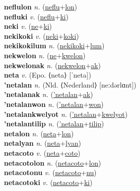 \textbf{neflulon} \textit{n.} (\hyperref[neflu]{neflu}+\hyperref[lon]{lon})
 \label{neflulon} \\
\textbf{nefluki} \textit{v.} (\hyperref[neflu]{neflu}+\hyperref[ki]{ki})
 \label{nefluki} \\
\textbf{neki} \textit{v.} (\hyperref[ne]{ne}+\hyperref[ki]{ki})
 \label{neki} \\
\textbf{nekikoki} \textit{v.} (\hyperref[neki]{neki}+\hyperref[koki]{koki})
 \label{nekikoki} \\
\textbf{nekikokilum} \textit{n.} (\hyperref[nekikoki]{nekikoki}+\hyperref[lum]{lum})
 \label{nekikokilum} \\
\textbf{nekwelon} \textit{n.} (\hyperref[ne]{ne}+\hyperref[kwelon]{kwelon})
 \label{nekwelon} \\
\textbf{nekwelonak} \textit{n.} (\hyperref[nekwelon]{nekwelon}+\hyperref[ak]{ak})
 \label{nekwelonak} \\
\textbf{neta} \textit{v.} (Epo. ⟨neta⟩ [ˈneta])
 \label{neta} \\
\textbf{'netalan} \textit{n.} (Nld. ⟨Nederland⟩ [neːdərlɑnt])
 \label{'netalan} \\
\textbf{'netalanak} \textit{n.} (\hyperref['netalan]{'netalan}+\hyperref[ak]{ak})
 \label{'netalanak} \\
\textbf{'netalanwon} \textit{n.} (\hyperref['netalan]{'netalan}+\hyperref[won]{won})
 \label{'netalanwon} \\
\textbf{'netalankwelyot} \textit{n.} (\hyperref['netalan]{'netalan}+\hyperref[kwelyot]{kwelyot})
 \label{'netalankwelyot} \\
\textbf{'netalantilip} \textit{n.} (\hyperref['netalan]{'netalan}+\hyperref[tilip]{tilip})
 \label{'netalantilip} \\
\textbf{netalon} \textit{n.} (\hyperref[neta]{neta}+\hyperref[lon]{lon})
 \label{netalon} \\
\textbf{netalyan} \textit{n.} (\hyperref[neta]{neta}+\hyperref[lyan]{lyan})
 \label{netalyan} \\
\textbf{netacoto} \textit{v.} (\hyperref[neta]{neta}+\hyperref[coto]{coto})
 \label{netacoto} \\
\textbf{netacotolon} \textit{n.} (\hyperref[netacoto]{netacoto}+\hyperref[lon]{lon})
 \label{netacotolon} \\
\textbf{netacotonu} \textit{v.} (\hyperref[netacoto]{netacoto}+\hyperref[nu]{nu})
 \label{netacotonu} \\
\textbf{netacotoki} \textit{v.} (\hyperref[netacoto]{netacoto}+\hyperref[ki]{ki})
 \label{netacotoki} \\
